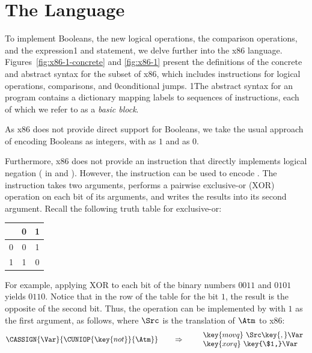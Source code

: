 \documentclass[7x10]{TimesAPriori_MIT}%
\def\racketEd{0}
\def\pythonEd{1}
\providecommand{\BookEdition}{1}
\let\edition\BookEdition
\newcommand{\racket}[1]{{\if\edition\racketEd{#1}\fi}}
\newcommand{\pythonColor}[0]{}
\newcommand{\python}[1]{{\if\edition\pythonEd\pythonColor #1\fi}}
\numberwithin{theorem}{chapter}
\numberwithin{definition}{chapter}
\numberwithin{equation}{chapter}
\begin{document}
\section{The \LangXIf{} Language}
\label{sec:x86-if}

To implement Booleans, the new logical operations, the
comparison operations, and the  expression\python{ and
  statement}, we delve further into the x86
language. Figures~\ref{fig:x86-1-concrete} and \ref{fig:x86-1} present
the definitions of the concrete and abstract syntax for the \LangXIf{}
subset of x86, which includes instructions for logical operations,
comparisons, and \racket{conditional} jumps.
%
\python{The abstract syntax for an \LangXIf{} program contains a
  dictionary mapping labels to sequences of instructions, each of
  which we refer to as a \emph{basic block}\index{subject}{basic
    block}.}

As x86 does not provide direct support for Booleans, we take the usual
approach of encoding Booleans as integers, with  as $1$ and
 as $0$.

Furthermore, x86 does not provide an instruction that directly
implements logical negation ( in \LangIf{} and \LangCIf{}).
However, the  instruction can be used to encode .
The  instruction takes two arguments, performs a pairwise
exclusive-or ($\mathrm{XOR}$) operation on each bit of its arguments,
and writes the results into its second argument.  Recall the following
truth table for exclusive-or:
\begin{center}
\begin{tabular}{l|cc}
   & 0 & 1 \\ \hline
0  & 0 & 1 \\
1  & 1 & 0
\end{tabular}
\end{center}
For example, applying $\mathrm{XOR}$ to each bit of the binary numbers
$0011$ and $0101$ yields $0110$. Notice that in the row of the table
for the bit $1$, the result is the opposite of the second bit.  Thus,
the  operation can be implemented by  with $1$ as
the first argument, as follows, where $\Src$ is the translation of
$\Atm$ to x86:
\[
\CASSIGN{\Var}{\CUNIOP{\key{not}}{\Atm}}
\qquad\Rightarrow\qquad
\begin{array}{l}
\key{movq}~ \Src\key{,} \Var\\
\key{xorq}~ \key{\$1,} \Var
\end{array}
\]
\end{document}
